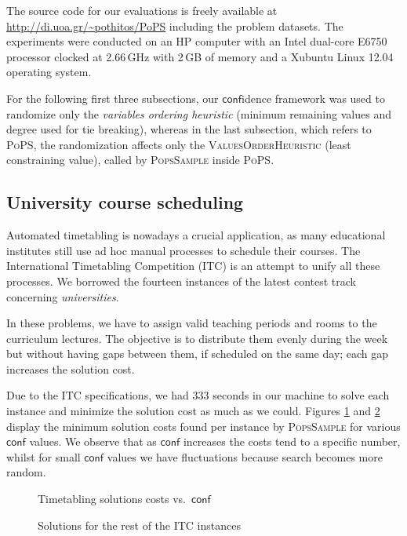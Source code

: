 \documentclass{ws-ijait}
\begin{document}
The source code for our evaluations is freely available at
\url{http://di.uoa.gr/~pothitos/PoPS} including the problem
datasets. The experiments were conducted on an HP computer
with an Intel dual-core E6750 processor clocked at 2.66\,GHz
with 2\,GB of memory and a Xubuntu Linux 12.04 operating
system.

For the following first three subsections, our
$\mathsf{conf}$idence framework was used to randomize only
the \emph{variables ordering heuristic} (minimum remaining
values and degree used for tie breaking), whereas in the
last subsection, which refers to \textsc{PoPS}, the
randomization affects only the \textsc{ValuesOrderHeuristic}
(least constraining value), called by \textsc{PopsSample}
inside \textsc{PoPS}.

\subsection{University course scheduling\label{ITC}}

Automated timetabling is nowadays a crucial application, as
many educational institutes still use ad hoc manual
processes to schedule their courses. The International
Timetabling Competition (ITC) is an attempt to unify all
these processes. We borrowed the fourteen instances of the
latest contest track concerning
\emph{universities}.\cite{McCollum2010}

In these problems, we have to assign valid teaching periods
and rooms to the curriculum lectures. The objective is to
distribute them evenly during the week but without having
gaps between them, if scheduled on the same day; each gap
increases the solution cost.\cite{Pothitos2012-Scheduling}

Due to the ITC specifications, we had 333 seconds in our
machine to solve each instance and minimize the solution
cost as much as we could. Figures \ref{costsA} and
\ref{costsB} display the minimum solution costs found per
instance by \textsc{PopsSample} for various $\mathsf{conf}$
values. We observe that as $\mathsf{conf}$ increases the
costs tend to a specific number, whilst for small
$\mathsf{conf}$ values we have fluctuations because search
becomes more random.

\begin{figure}
  \centering
  
  \caption{Timetabling solutions costs vs.\ 
           $\mathsf{conf}$\label{costsA}}
\end{figure}

\begin{figure}
  \centering
  
  \caption{Solutions for the rest of the ITC
           instances\label{costsB}}
\end{figure}
\end{document}
